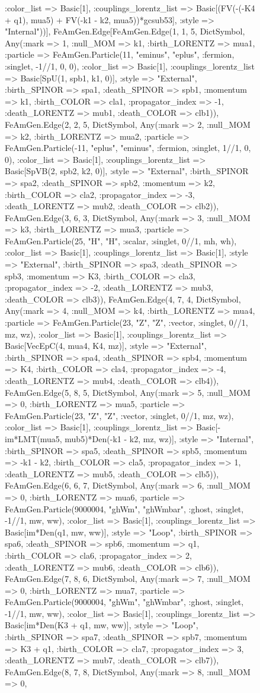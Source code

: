 \documentclass{revtex4}
\begin{document}
\begin{figure}[!htb]
\begin{center}
{:color_list => Basic[1], :couplings_lorentz_list => Basic[(FV(-(-K4 + q1), mua5) + FV(-k1 - k2, mua5))*gcsub53], :style => "Internal"))], FeAmGen.Edge[FeAmGen.Edge(1, 1, 5, Dict{Symbol, Any}(:mark => 1, :null_MOM => k1, :birth_LORENTZ => mua1, :particle => FeAmGen.Particle(11, "eminus", "eplus", :fermion, :singlet, -1//1, 0, 0), :color_list => Basic[1], :couplings_lorentz_list => Basic[SpU(1, spb1, k1, 0)], :style => "External", :birth_SPINOR => spa1, :death_SPINOR => spb1, :momentum => k1, :birth_COLOR => cla1, :propagator_index => -1, :death_LORENTZ => mub1, :death_COLOR => clb1)), FeAmGen.Edge(2, 2, 5, Dict{Symbol, Any}(:mark => 2, :null_MOM => k2, :birth_LORENTZ => mua2, :particle => FeAmGen.Particle(-11, "eplus", "eminus", :fermion, :singlet, 1//1, 0, 0), :color_list => Basic[1], :couplings_lorentz_list => Basic[SpVB(2, spb2, k2, 0)], :style => "External", :birth_SPINOR => spa2, :death_SPINOR => spb2, :momentum => k2, :birth_COLOR => cla2, :propagator_index => -3, :death_LORENTZ => mub2, :death_COLOR => clb2)), FeAmGen.Edge(3, 6, 3, Dict{Symbol, Any}(:mark => 3, :null_MOM => k3, :birth_LORENTZ => mua3, :particle => FeAmGen.Particle(25, "H", "H", :scalar, :singlet, 0//1, mh, wh), :color_list => Basic[1], :couplings_lorentz_list => Basic[1], :style => "External", :birth_SPINOR => spa3, :death_SPINOR => spb3, :momentum => K3, :birth_COLOR => cla3, :propagator_index => -2, :death_LORENTZ => mub3, :death_COLOR => clb3)), FeAmGen.Edge(4, 7, 4, Dict{Symbol, Any}(:mark => 4, :null_MOM => k4, :birth_LORENTZ => mua4, :particle => FeAmGen.Particle(23, "Z", "Z", :vector, :singlet, 0//1, mz, wz), :color_list => Basic[1], :couplings_lorentz_list => Basic[VecEpC(4, mua4, K4, mz)], :style => "External", :birth_SPINOR => spa4, :death_SPINOR => spb4, :momentum => K4, :birth_COLOR => cla4, :propagator_index => -4, :death_LORENTZ => mub4, :death_COLOR => clb4)), FeAmGen.Edge(5, 8, 5, Dict{Symbol, Any}(:mark => 5, :null_MOM => 0, :birth_LORENTZ => mua5, :particle => FeAmGen.Particle(23, "Z", "Z", :vector, :singlet, 0//1, mz, wz), :color_list => Basic[1], :couplings_lorentz_list => Basic[-im*LMT(mua5, mub5)*Den(-k1 - k2, mz, wz)], :style => "Internal", :birth_SPINOR => spa5, :death_SPINOR => spb5, :momentum => -k1 - k2, :birth_COLOR => cla5, :propagator_index => 1, :death_LORENTZ => mub5, :death_COLOR => clb5)), FeAmGen.Edge(6, 6, 7, Dict{Symbol, Any}(:mark => 6, :null_MOM => 0, :birth_LORENTZ => mua6, :particle => FeAmGen.Particle(9000004, "ghWm", "ghWmbar", :ghost, :singlet, -1//1, mw, ww), :color_list => Basic[1], :couplings_lorentz_list => Basic[im*Den(q1, mw, ww)], :style => "Loop", :birth_SPINOR => spa6, :death_SPINOR => spb6, :momentum => q1, :birth_COLOR => cla6, :propagator_index => 2, :death_LORENTZ => mub6, :death_COLOR => clb6)), FeAmGen.Edge(7, 8, 6, Dict{Symbol, Any}(:mark => 7, :null_MOM => 0, :birth_LORENTZ => mua7, :particle => FeAmGen.Particle(9000004, "ghWm", "ghWmbar", :ghost, :singlet, -1//1, mw, ww), :color_list => Basic[1], :couplings_lorentz_list => Basic[im*Den(K3 + q1, mw, ww)], :style => "Loop", :birth_SPINOR => spa7, :death_SPINOR => spb7, :momentum => K3 + q1, :birth_COLOR => cla7, :propagator_index => 3, :death_LORENTZ => mub7, :death_COLOR => clb7)), FeAmGen.Edge(8, 7, 8, Dict{Symbol, Any}(:mark => 8, :null_MOM => 0, }
\end{center}
\end{figure}
\end{document}

